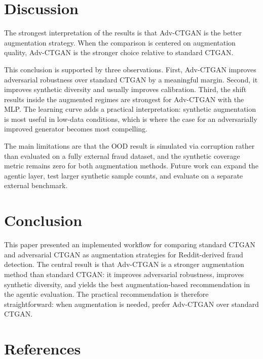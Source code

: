 \documentclass[conference]{IEEEtran}
\begin{document}
\section{Discussion}

The strongest interpretation of the results is that Adv-CTGAN is the better augmentation strategy. When the comparison is centered on augmentation quality, Adv-CTGAN is the stronger choice relative to standard CTGAN.

This conclusion is supported by three observations. First, Adv-CTGAN improves adversarial robustness over standard CTGAN by a meaningful margin. Second, it improves synthetic diversity and usually improves calibration. Third, the shift results inside the augmented regimes are strongest for Adv-CTGAN with the MLP. The learning curve adds a practical interpretation: synthetic augmentation is most useful in low-data conditions, which is where the case for an adversarially improved generator becomes most compelling.

The main limitations are that the OOD result is simulated via corruption rather than evaluated on a fully external fraud dataset, and the synthetic coverage metric remains zero for both augmentation methods. Future work can expand the agentic layer, test larger synthetic sample counts, and evaluate on a separate external benchmark.

\section{Conclusion}

This paper presented an implemented workflow for comparing standard CTGAN and adversarial CTGAN as augmentation strategies for Reddit-derived fraud detection. The central result is that Adv-CTGAN is a stronger augmentation method than standard CTGAN: it improves adversarial robustness, improves synthetic diversity, and yields the best augmentation-based recommendation in the agentic evaluation. The practical recommendation is therefore straightforward: when augmentation is needed, prefer Adv-CTGAN over standard CTGAN.

\section{References}
\end{document}

